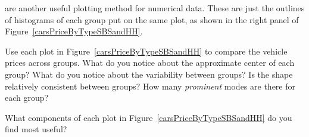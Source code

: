  are another useful plotting method for numerical data. These are just the outlines of histograms of each group put on the same plot, as shown in the right panel of Figure~\ref{carsPriceByTypeSBSandHH}.

\begin{exercise} \label{comparingPriceByTypeExercise}
Use each plot in Figure~\ref{carsPriceByTypeSBSandHH} to compare the vehicle prices across groups. What do you notice about the approximate center of each group? What do you notice about the variability between groups? Is the shape relatively consistent between groups? How many \emph{prominent} modes are there for each group?
\end{exercise}

\begin{exercise}
What components of each plot in Figure~\ref{carsPriceByTypeSBSandHH} do you find most useful?
\end{exercise}


